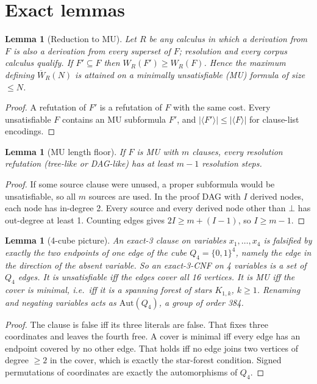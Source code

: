 \documentclass[11pt]{article}
\newtheorem{lemma}[theorem]{Lemma}
\begin{document}
\section{Exact lemmas}
\begin{lemma}[Reduction to MU]
Let $R$ be any calculus in which a derivation from $F$ is also a derivation from every superset of $F$; resolution and every corpus calculus qualify. If $F'\subseteq F$ then $W_R(F')\ge W_R(F)$. Hence the maximum defining $\overline W_R(N)$ is attained on a minimally unsatisfiable (MU) formula of size $\le N$.
\end{lemma}
\begin{proof}
A refutation of $F'$ is a refutation of $F$ with the same cost. Every unsatisfiable $F$ contains an MU subformula $F'$, and $|\langle F'\rangle|\le|\langle F\rangle|$ for clause-list encodings.
\end{proof}
\begin{lemma}[MU length floor]
If $F$ is MU with $m$ clauses, every resolution refutation (tree-like or DAG-like) has at least $m-1$ resolution steps.
\end{lemma}
\begin{proof}
If some source clause were unused, a proper subformula would be unsatisfiable, so all $m$ sources are used. In the proof DAG with $I$ derived nodes, each node has in-degree 2. Every source and every derived node other than $\bot$ has out-degree at least 1. Counting edges gives $2I\ge m+(I-1)$, so $I\ge m-1$.
\end{proof}
\begin{lemma}[4-cube picture]
An exact-3 clause on variables $x_1,\dots,x_4$ is falsified by exactly the two endpoints of one edge of the cube $Q_4=\{0,1\}^4$, namely the edge in the direction of the absent variable. So an exact-3-CNF on 4 variables is a set of $Q_4$ edges. It is unsatisfiable iff the edges cover all 16 vertices. It is MU iff the cover is minimal, i.e.\ iff it is a spanning forest of stars $K_{1,k}$, $k\ge1$. Renaming and negating variables acts as $\mathrm{Aut}(Q_4)$, a group of order 384.
\end{lemma}
\begin{proof}
The clause is false iff its three literals are false. That fixes three coordinates and leaves the fourth free. A cover is minimal iff every edge has an endpoint covered by no other edge. That holds iff no edge joins two vertices of degree $\ge2$ in the cover, which is exactly the star-forest condition. Signed permutations of coordinates are exactly the automorphisms of $Q_4$.
\end{proof}
\end{document}
